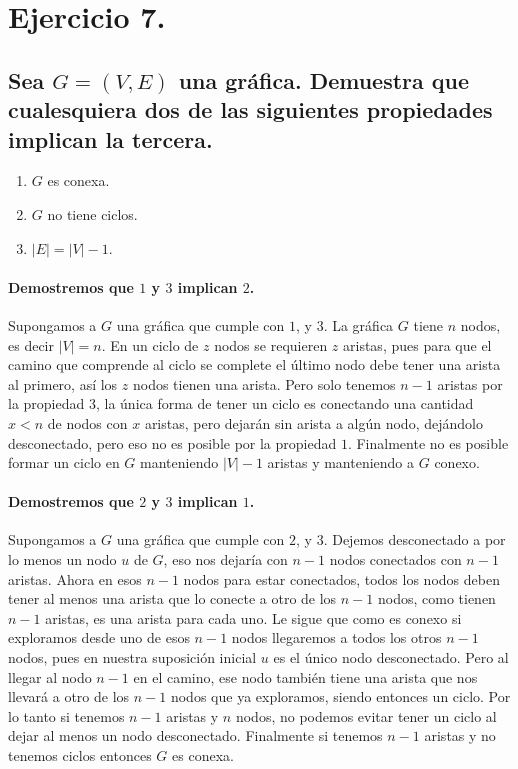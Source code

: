 \documentclass[12pt]{article}
\begin{document}
\section{Ejercicio 7.}
\subsection{Sea $G=(V,E)$ una gráfica. Demuestra que cualesquiera dos de las siguientes propiedades implican la tercera.}
\begin{enumerate}
	\item $G$ es conexa.
	\item $G$ no tiene ciclos.
	\item $|E| = |V| - 1$.
\end{enumerate}
\paragraph{Demostremos que $1$ y $3$ implican $2$.}
Supongamos a $G$ una gráfica que cumple con $1$, y $3$. La gráfica $G$ tiene $n$ nodos, es decir $|V| = n$. En un ciclo de $z$ nodos se requieren $z$ aristas, pues para que el camino que comprende al ciclo se complete el último nodo debe tener una arista al primero, así los $z$ nodos tienen una arista. Pero solo tenemos $n - 1$ aristas por la propiedad $3$, la única forma de tener un ciclo es conectando una cantidad $x<n$ de nodos con $x$ aristas, pero dejarán sin arista a algún nodo, dejándolo  desconectado, pero eso no es posible por la propiedad $1$. Finalmente no es posible formar un ciclo en $G$ manteniendo $|V| - 1$ aristas y manteniendo a $G$ conexo.
\paragraph{Demostremos que $2$ y $3$ implican $1$.}
Supongamos a $G$ una gráfica que cumple con $2$, y $3$. Dejemos desconectado a por lo menos un nodo $u$ de $G$, eso nos dejaría con $n-1$ nodos conectados con $n-1$ aristas. Ahora en esos $n-1$ nodos para estar conectados, todos los nodos deben tener al menos una arista que lo conecte a otro de los $n-1$ nodos, como tienen $n-1$ aristas, es una arista para cada uno. Le sigue que como es conexo si exploramos desde uno de esos $n-1$ nodos llegaremos a todos los otros $n-1$ nodos, pues en nuestra suposición inicial $u$ es el único nodo desconectado. Pero al llegar al nodo $n-1$ en el camino, ese nodo también tiene una arista que nos llevará a otro de los $n-1$ nodos que ya exploramos, siendo entonces un ciclo. Por lo tanto si tenemos $n-1$ aristas y $n$ nodos, no podemos evitar tener un ciclo al dejar al menos un nodo desconectado. Finalmente si tenemos $n-1$ aristas y no tenemos ciclos entonces $G$ es conexa.
\pagebreak
\end{document}
